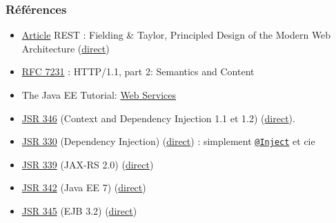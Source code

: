 \documentclass[english, french]{beamer}
\begin{document}
\begin{frame}
	\frametitle{Références}
	\begin{itemize}
		\item \href{http://doi.org/10.1145/337180.337228}{Article} REST : Fielding \& Taylor, Principled Design of the Modern Web Architecture (\href{https://www.ics.uci.edu/~fielding/pubs/webarch_icse2000.pdf}{direct})%
		\item \href{http://www.w3.org/Protocols/}{RFC 7231} : HTTP/1.1, part 2: Semantics and Content
		\item The Java EE Tutorial: \href{http://docs.oracle.com/javaee/7/tutorial/partwebsvcs.htm}{Web Services}
		\item \href{https://jcp.org/en/jsr/detail?id=346}{JSR 346} (Context and Dependency Injection 1.1 et 1.2) (\href{http://download.oracle.com/otn-pub/jcp/cdi-1_2-mrel-eval-spec/cdi-1.2.pdf}{direct}).
		\item \href{https://jcp.org/en/jsr/detail?id=330}{JSR 330} (Dependency Injection) (\href{http://download.oracle.com/otn-pub/jcp/dependency_injection-1.0-final-oth-JSpec/dependency_injection-1_0-final-spec.zip}{direct}) : simplement \href{http://docs.oracle.com/javaee/7/api/javax/inject/Inject.html}{\texttt{@Inject}} et cie
		\item \href{https://jcp.org/en/jsr/detail?id=339}{JSR 339} (JAX-RS 2.0) (\href{http://download.oracle.com/otn-pub/jcp/jaxrs-2_0_rev_A-mrel-eval-spec/jsr339-jaxrs-2.0-final-spec.pdf}{direct})
		\item \href{https://jcp.org/en/jsr/detail?id=342}{JSR 342} (Java EE 7) (\href{http://download.oracle.com/otn-pub/jcp/java_ee-7-mrel-eval-spec/JavaEE_Platform_Spec.pdf}{direct})
		\item \href{https://jcp.org/en/jsr/detail?id=345}{JSR 345} (EJB 3.2) (\href{http://download.oracle.com/otn-pub/jcp/ejb-3_2-fr-eval-spec/ejb-3_2-core-fr-spec.pdf}{direct})
	\end{itemize}
\end{frame}
\end{document}
